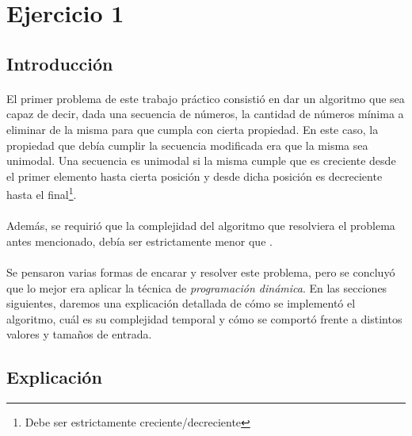 \section{Ejercicio 1}


\subsection{Introducción}

\paragraph{}
El primer problema de este trabajo práctico consistió en dar un algoritmo que sea capaz de decir, dada una secuencia de números, la cantidad de números mínima a eliminar de la misma para que cumpla con cierta propiedad. En este caso, la propiedad que debía cumplir la secuencia  modificada era que la misma sea unimodal. Una secuencia es unimodal si la misma cumple que es creciente desde el primer elemento hasta cierta posición y desde dicha posición es decreciente hasta el final\footnote{Debe ser estrictamente creciente/decreciente}.

\paragraph{}
Además, se requirió que la complejidad del algoritmo que resolviera el problema antes mencionado, debía ser estrictamente menor que .

\paragraph{}
Se pensaron varias formas de encarar y resolver este problema, pero se concluyó que lo mejor era aplicar la técnica de \textit{programación dinámica}. En las secciones siguientes, daremos una explicación detallada de cómo se implementó el algoritmo, cuál es su complejidad temporal y cómo se comportó frente a distintos valores y tamaños de entrada.


\subsection{Explicación}

